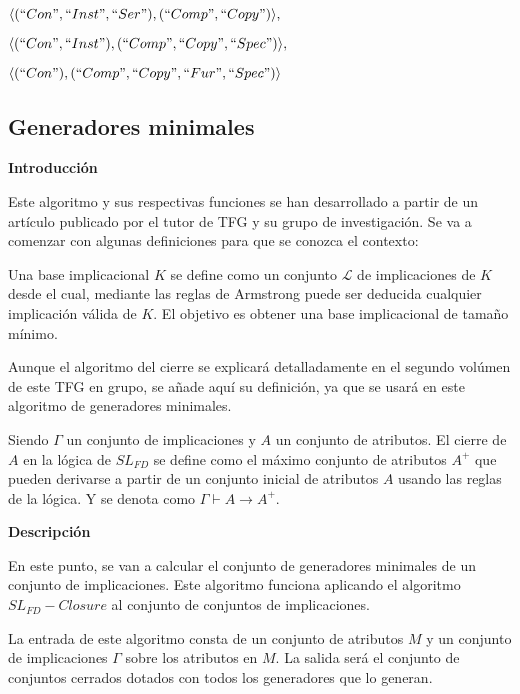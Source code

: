         \(\langle (``Con", ``Inst", ``Ser"), (``Comp", ``Copy") \rangle ,\)

        \(\langle (``Con", ``Inst"), (``Comp", ``Copy", ``Spec") \rangle ,\)

        \(\langle (``Con"), (``Comp", ``Copy", ``Fur", ``Spec") \rangle   \)
        \clearpage
        
\subsection{Generadores minimales}


    \textbf{Introducci\'on}

    Este algoritmo y sus respectivas funciones se han desarrollado a partir de un art\'iculo publicado por el tutor de 
    TFG y su grupo de investigaci\'on\cite{cla2012}.
    Se va a comenzar con algunas definiciones para que se conozca el contexto:

    Una base implicacional \(K\) se define como un conjunto \(\mathcal{L}\) de implicaciones de \(K\) desde el cual, mediante las reglas de 
    Armstrong puede ser deducida cualquier implicaci\'on v\'alida de \(K\). El objetivo es obtener una base implicacional de tama\~no 
    m\'inimo.

    Aunque el algoritmo del cierre se explicar\'a detalladamente en el segundo vol\'umen de este TFG en grupo, se a\~nade aqu\'i su 
    definici\'on, ya que se usar\'a en este algoritmo de generadores minimales.

    Siendo \(\Gamma\) un conjunto de implicaciones y \(A\) un conjunto de atributos. El cierre de \(A\) en la l\'ogica de \(SL_{FD}\) se define como 
    el m\'aximo conjunto de atributos \(A^+\) que pueden derivarse a partir de un conjunto inicial de atributos \(A\) usando las reglas de la 
    l\'ogica. Y se denota como \(\Gamma \vdash A \rightarrow A^+\).


    \bigskip
    \textbf{Descripci\'on}

    En este punto, se van a calcular el conjunto de generadores minimales de un conjunto de implicaciones. Este algoritmo funciona aplicando 
    el algoritmo \(SL_{FD}-Closure\) al conjunto de conjuntos de implicaciones.

    La entrada de este algoritmo consta de un conjunto de atributos \(M\) y un conjunto de implicaciones \(\Gamma\) sobre los atributos en \(M\).
    La salida ser\'a el conjunto de conjuntos cerrados dotados con todos los generadores que lo generan.

